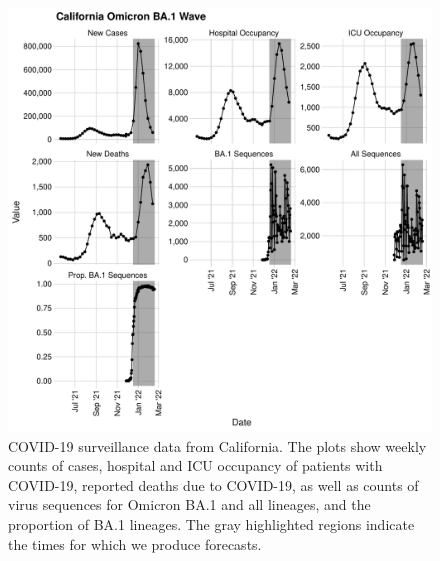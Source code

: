 \begin{figure}
    \centering
    \includegraphics[width=1.0\columnwidth]{figures/ch_5/california_binned_data_plot.pdf}
    \caption[COVID-19 surveillance data from California.]{
COVID-19 surveillance data from California.
The plots show weekly counts of cases, hospital and ICU occupancy of patients with COVID-19, reported deaths due to COVID-19, as well as counts of virus sequences for Omicron BA.1 and all lineages, and the proportion of BA.1 lineages.
The gray highlighted regions indicate the times for which we produce forecasts.}
    \label{ch_1:fig:california_binned_data_plot}
\end{figure}

